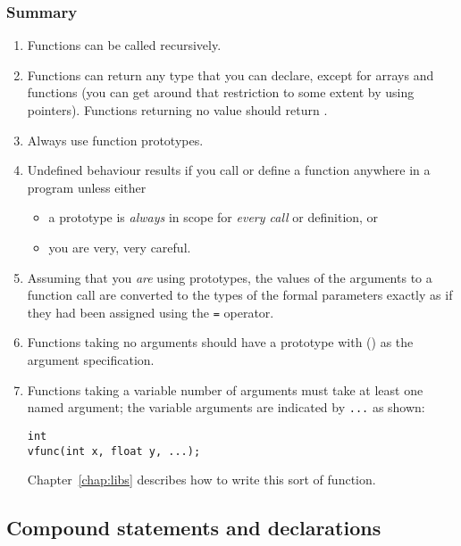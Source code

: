   \subsubsection{Summary}
    \begin{enumerate}
     \item Functions can be called recursively.
     \item Functions can return any type that you can declare, except for
      arrays and functions (you can get around that restriction to some
      extent by using pointers). Functions returning no value should return
      \void.
     \item Always use function prototypes.
     \item Undefined behaviour results if you call or define a function
      anywhere in a program unless either
      \begin{itemize}
       \item a prototype is \textit{always} in scope for \textit{every call}
        or definition, or
       \item you are very, very careful.
      \end{itemize}
     
     \item Assuming that you \textit{are} using prototypes, the values of the
      arguments to a function call are converted to the types of the formal
      parameters exactly as if they had been assigned using
      the \texttt{=} operator.
     \item Functions taking no arguments should have a prototype with
      (\void{}) as the argument specification.
     \item 
      Functions taking a variable number of arguments must take at least
       one named argument; the variable arguments are indicated
       by \texttt{...} as shown:

\begin{Verbatim}
int
vfunc(int x, float y, ...);
\end{Verbatim}

      Chapter~\ref{chap:libs} describes how to write this sort of
       function.

     
    \end{enumerate}
  

 

  \subsection{Compound statements and declarations}
   

